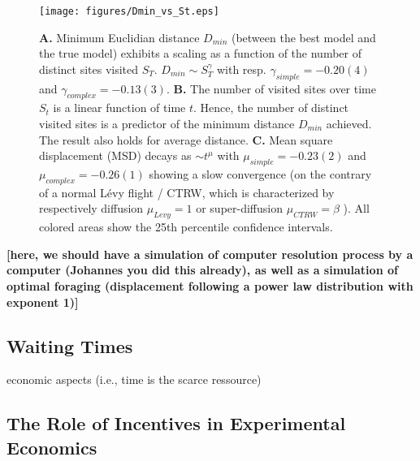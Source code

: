 \begin{figure}[h!]
\begin{center}
\texttt{[image: figures/Dmin\_vs\_St.eps]}
\caption{{\bf A.} Minimum Euclidian distance $D_{min}$ (between the best model and the true model) exhibits a scaling as a function of the number of distinct sites visited $S_{T}$. $D_{min} \sim S_{T}^{\gamma}$ with resp. $\gamma_{simple} = -0.20(4)$ and $\gamma_{complex} = - 0.13(3)$. {\bf B.}  The number of visited sites over time $S_t$ is a linear function of time $t$. Hence, the number of distinct visited sites is a predictor of the minimum distance $D_{min}$ achieved. The result also holds for average distance. {\bf C.}  Mean square displacement (MSD) decays as $\sim t^{\mu}$ with $\mu_{simple} =-0.23(2)$ and $\mu_{complex} =- 0.26(1)$ showing a slow convergence (on the contrary of a normal L\'evy flight / CTRW, which is characterized by respectively diffusion $\mu_{Levy} = 1$ or super-diffusion $\mu_{CTRW} = \beta$ \cite{21,23}). All colored areas show the 25th percentile confidence intervals.}
\label{fig:Dmin_vs_St}
\end{center}
\end{figure}


{\bf [here, we should have a simulation of computer resolution process by a computer (Johannes you did this already), as well as a simulation of optimal foraging (displacement following a power law distribution with exponent 1)]}


\subsection{Waiting Times}

economic aspects (i.e., time is the scarce ressource)

\subsection{The Role of Incentives in Experimental Economics}

